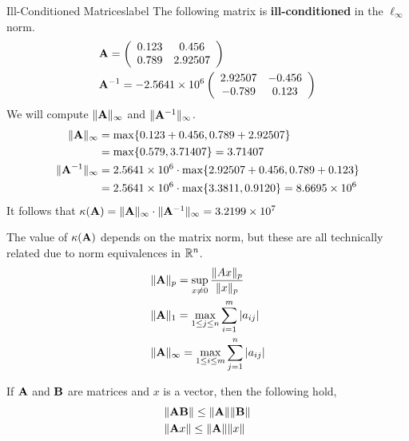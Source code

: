 \begin{ex}{Ill-Conditioned Matrices}{label}
    The following matrix is \textbf{ill-conditioned} in the $\ell_{\infty}$ norm.
    \begin{align*}
        &\mathbf{A}=\left(\begin{array}{cc}
            0.123 & 0.456 \\
            0.789 & 2.92507
                \end{array}\right) \\
        &\mathbf{A}^{-1}=-2.5641 \times 10^6\left(\begin{array}{cc}
            2.92507 & -0.456 \\
            -0.789 & 0.123
            \end{array}\right)
    \end{align*}
    We will compute $\|\mathbf{A}\|_{\infty}$ and $\|\mathbf{A}^{-1}\|_{\infty}$.
    \begin{align*}
    \|\mathbf{A}\|_{\infty} &=\max \{0.123+0.456,0.789+2.92507\} \\
    &=\max \{0.579,3.71407\}=3.71407 \\
    \|\mathbf{A}^{-1}\|_{\infty} &=2.5641 \times 10^6 \cdot \max \{2.92507+0.456,0.789+0.123\} \\
    &=2.5641 \times 10^6 \cdot \max \{3.3811,0.9120\}=8.6695 \times 10^6
    \end{align*}
    It follows that $\kappa(\mathbf{A}) = \|\mathbf{A}\|_{\infty} \cdot \|\mathbf{A}^{-1}\|_{\infty} =3 .2199 \times 10^7$
\end{ex}

\begin{marginfigure}
    The value of $\kappa(\mathbf{A})$ depends on the matrix norm, but these are all technically related due to norm equivalences in $\mathbb{R}^n$.
    \begin{align*}
        &\|\mathbf{A}\|_p=\sup _{x \neq 0} \frac{\|A x\|_p}{\|x\|_p} \\
        &\|\mathbf{A}\|_1=\max _{1 \leq j \leq n} \sum_{i=1}^m\left|a_{i j}\right|\\
        &\|\mathbf{A}\|_{\infty}=\max _{1 \leq i \leq m} \sum_{j=1}^n\left|a_{i j}\right|
    \end{align*}
\end{marginfigure}

\begin{marginfigure}
    If $\mathbf{A}$ and $\mathbf{B}$ are matrices and $x$ is a vector, then the following hold,
    \begin{align*}
        &\|\mathbf{A} \mathbf{B}\| \leq\| \mathbf{A} \|\| \mathbf{B}\| \\
        &\|\mathbf{A} x\| \leq\|\mathbf{A}\|\|x\|
    \end{align*}
    
\end{marginfigure}
